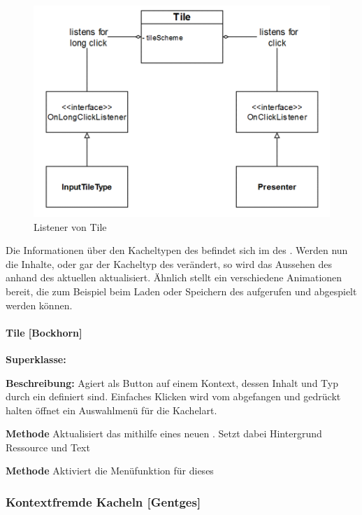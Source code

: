\begin{figure}[!h]
	\includegraphics[scale=1]{img/listener-von-tile}
	\caption[Listener von Tile]{Listener von Tile\footnotemark}
\end{figure}

Die Informationen über den Kacheltypen des  befindet sich im  des . Werden nun die Inhalte, oder gar der Kacheltyp des  verändert, so wird das Aussehen des  anhand des aktuellen  aktualisiert. Ähnlich stellt ein  verschiedene Animationen bereit, die zum Beispiel beim Laden oder Speichern des  aufgerufen und abgespielt werden können.

\paragraph{Tile [Bockhorn]}

\textbf{Superklasse:} 

\textbf{Beschreibung:} Agiert als Button auf einem Kontext, dessen Inhalt und Typ durch ein  definiert sind. Einfaches Klicken wird vom  abgefangen und gedrückt halten öffnet ein Auswahlmenü für die Kachelart. 

\textbf{Methode}  Aktualisiert das  mithilfe eines neuen . Setzt dabei Hintergrund Ressource und Text

\textbf{Methode}  Aktiviert die Menüfunktion für dieses 

\subsubsection{Kontextfremde Kacheln [Gentges]}

